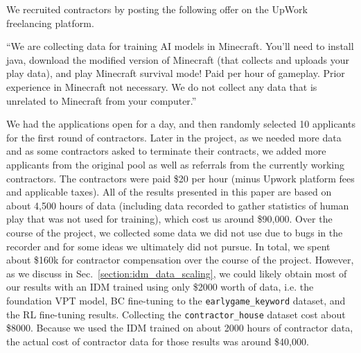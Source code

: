 We recruited contractors by posting the following offer on the UpWork freelancing platform. 

\begin{displayquote}
``We are collecting data for training AI models in Minecraft. You'll need to install java, download the modified version of Minecraft (that collects and uploads your play data), and play Minecraft survival mode! Paid per hour of gameplay. Prior experience in Minecraft not necessary. We do not collect any data that is unrelated to Minecraft from your computer.''
\end{displayquote}

We had the applications open for a day, and then randomly selected 10 applicants for the first round of contractors. Later in the project, as we needed more data and as some contractors asked to terminate their contracts, we added more applicants from the original pool as well as referrals from the currently working contractors.
The contractors were paid \$20 per hour (minus Upwork platform fees and applicable taxes). All of the results presented in this paper are based on about 4,500 hours of data (including data recorded to gather statistics of human play that was not used for training), which cost us around \$90,000. Over the course of the project, we collected some data we did not use due to bugs in the recorder and for some ideas we ultimately did not pursue. In total, we spent about \$160k for contractor compensation over the course of the project. However, as we discuss in Sec.~\ref{section:idm_data_scaling}, we could likely obtain most of our results with an IDM trained using only \$2000 worth of data, i.e. the foundation VPT model, BC fine-tuning to the \texttt{earlygame\_keyword} dataset, and the RL fine-tuning results. Collecting the \texttt{contractor\_house} dataset cost about \$8000. Because we used the IDM trained on about 2000 hours of contractor data, the actual cost of contractor data for those results was around \$40,000.

